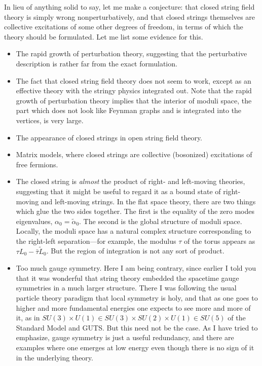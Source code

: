 In lieu of anything solid to say, let me make a conjecture: that
closed string field theory is simply wrong nonperturbatively, and that
closed strings themselves are collective excitations of some other
degrees of freedom, in terms of which the theory should be formulated.
Let me list some evidence for this.
\begin{itemize}
\item  The rapid growth of perturbation theory, suggesting that the
perturbative description is rather far from the exact formulation.
\item  The fact that closed string field theory does not seem to work,
except as an effective theory with the stringy physics integrated out.
Note that the rapid growth of perturbation theory implies that the
interior of moduli space, the part which does not look like Feynman
graphs and is integrated into the vertices, is very large.
\item  The appearance of closed strings in open string field theory.
\item  Matrix models, where closed strings are collective (bosonized)
excitations of free fer\-mions.
\item  The closed string is {\it almost} the product of
right- and left-moving theories, suggesting that it might be useful
to regard it as a bound state of right-moving and left-moving
strings.  In the flat space theory,
there are two things which glue the two sides together.  The first is
the equality of the zero modes eigenvalues, $\alpha_0 =
\tilde\alpha_0$.  The second is the global structure of moduli space.
Locally, the moduli space has a natural complex structure
corresponding to the right-left separation---for example, the modulus
$\tau$ of the torus appears as $\tau L_0 - \bar\tau \tilde L_0$.
But the region of integration is not any sort of product.
\item  Too much gauge symmetry.
Here I am being contrary, since earlier I told you that it was
wonderful that string theory embedded the spacetime gauge symmetries
in a much larger structure.  There I was following the usual particle
theory paradigm that local symmetry is holy, and that as one goes to
higher and more fundamental energies one expects to see more and more
of it, as in $SU(3) \times U(1) \in SU(3) \times SU(2) \times U(1)
\in SU(5)$ of the Standard Model and GUTS.  But this need not be the
case.  As I have tried to emphasize, gauge symmetry is just a
useful redundancy, and there are examples where one emerges at low
energy even though there is no sign of it in the underlying theory.

\end{itemize}
